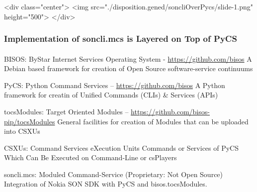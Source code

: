 \begin{htmlonly}

\begin{frame}[fragile,plain,label=soncliOverPycs]
    \frametitle{}
    \framesubtitle{}
    \begin{rawhtml}
<div class="center">
<img src="./disposition.gened/soncliOverPycs/slide-1.png" height="500">
</div>
    \end{rawhtml}
\end{frame}
\end{htmlonly}

\begin{verblatex}

\begin{frame}[fragile,plain,label=soncliOverPycs]
    \frametitle{Implementation of soncli.mcs is Layered on Top of PyCS}
    \framesubtitle{}

    \begin{exampleblock}{BISOS: ByStar Internet Services Operating System - \small{\url{https://github.com/bisos}}}
      \small{A Debian based framework for creation of Open Source software-service continuums}
    \end{exampleblock}

    \begin{block}{PyCS: Python Command Services -- \small{\url{https://github.com/bisos}}}
    \small{A Python framework for creatin of Unified Commands (CLIs) \& Services (APIs)}
    \end{block}

    \begin{block}{tocsModules: Target Oriented Modules -- \tiny{\url{https://github.com/bisos-pip/tocsModules}}}
    \small{General facilities for creation of Modules that can be uploaded into CSXUs}
    \end{block}

    \begin{block}{CSXUs: Command Services eXecution Units}
    \small{Commands or Services of PyCS Which Can Be Executed on Command-Line or csPlayers}
    \end{block}

    \begin{alertblock}{soncli.mcs: Moduled Command-Service  (Proprietary: Not Open Source)}
    \small{Integration of Nokia SON SDK with PyCS and  bisos.tocsModules.}
    \end{alertblock}



\end{frame}
\end{verblatex}
